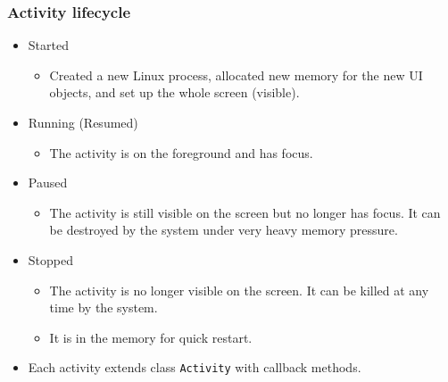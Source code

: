 \documentclass[10pt,xcolor=pdflatex]{beamer}
\begin{document}
\begin{frame}\frametitle{Activity lifecycle}
	\begin{itemize}
        \item Started
          \begin{itemize}
        	\item Created a new Linux process, allocated new memory for the new UI objects, and set up the whole screen (visible).
          \end{itemize}
		\item Running (Resumed)
          \begin{itemize}
        	\item The activity is on the foreground and has focus.
          \end{itemize}
 		\item Paused
          \begin{itemize}
        	\item The activity is still visible on the screen but no longer has focus. It can be destroyed by the system under very heavy memory pressure.
          \end{itemize}
 		\item Stopped
          \begin{itemize}
        	\item The activity is no longer visible on the screen. It can be killed at any time by the system.
            \item It is in the memory for quick restart.
          \end{itemize}
	\end{itemize}
    \medskip
    \begin{itemize}
        \item Each activity extends class \texttt{Activity} with callback methods.
    \end{itemize}
\end{frame}
\end{document}
